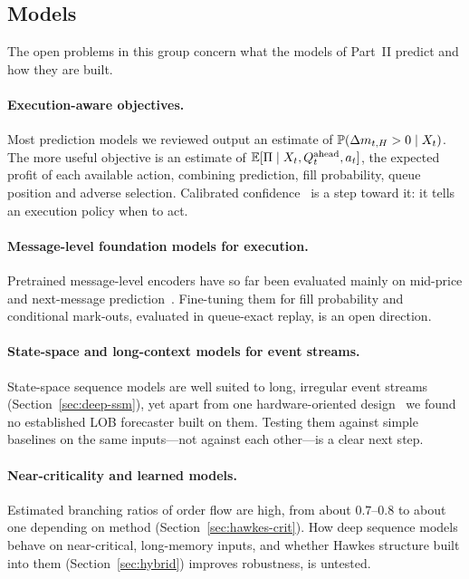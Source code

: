 \subsection{Models}

The open problems in this group concern what the models of Part~II predict and how they are built.

\paragraph{Execution-aware objectives.} Most prediction models we reviewed output
an estimate of $\P(\Delta m_{t,H} > 0 \mid X_t)$. The more useful objective is an estimate of
$\E[\Pi \mid X_t, Q^{\text{ahead}}_t, a_t]$, the expected profit of each available action,
combining prediction, fill probability, queue position and adverse selection. Calibrated
confidence~\citep{manoharan2026uqlob} is a step toward it: it tells an execution policy when to act.

\paragraph{Message-level foundation models for execution.} Pretrained message-level encoders have
so far been evaluated mainly on mid-price and next-message prediction~\citep{linna2025lobert}.
Fine-tuning them for fill probability and conditional mark-outs, evaluated in queue-exact replay,
is an open direction.

\paragraph{State-space and long-context models for event streams.} State-space sequence models are well
suited to long, irregular event streams (Section~\ref{sec:deep-ssm}), yet apart from one hardware-oriented design~\citep{popov2026ssm} we found no established LOB forecaster built on them.
Testing them against simple baselines on the same inputs---not against each other---is a clear
next step.

\paragraph{Near-criticality and learned models.} Estimated branching ratios of order flow are high,
from about $0.7$--$0.8$ to about one depending on method (Section~\ref{sec:hawkes-crit}). How deep sequence
models behave on near-critical, long-memory inputs, and whether Hawkes structure built into them
(Section~\ref{sec:hybrid}) improves robustness, is untested.

